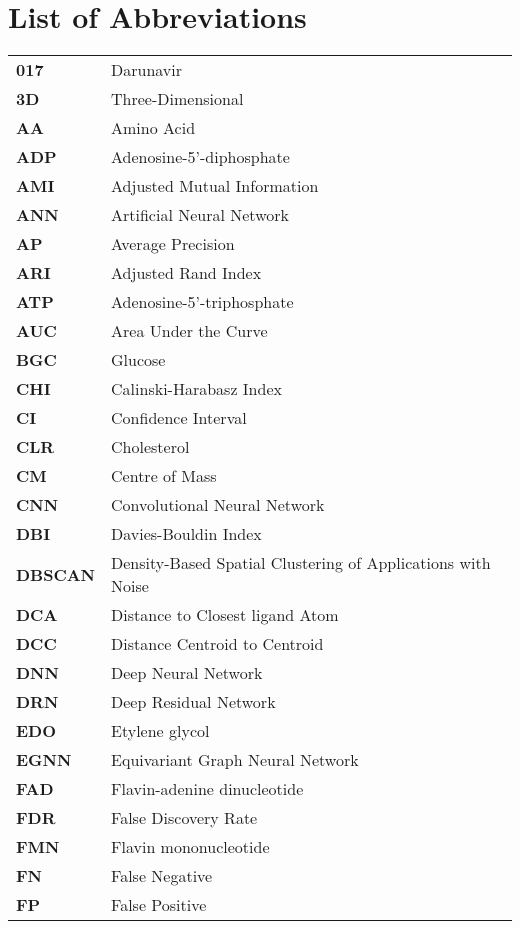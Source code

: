 \chapter*{List of Abbreviations}

\begin{longtable}[l]{@{}p{2.5cm}p{12cm}@{}}
\textbf{017} & Darunavir \\
\textbf{3D} & Three-Dimensional \\
\textbf{AA} & Amino Acid \\
\textbf{ADP} & Adenosine-5'-diphosphate \\
\textbf{AMI} & Adjusted Mutual Information \\
\textbf{ANN} & Artificial Neural Network \\
\textbf{AP} & Average Precision \\
\textbf{ARI} & Adjusted Rand Index \\
\textbf{ATP} & Adenosine-5’-triphosphate \\
\textbf{AUC} & Area Under the Curve \\
\textbf{BGC} & Glucose \\
\textbf{CHI} & Calinski-Harabasz Index \\
\textbf{CI} & Confidence Interval \\
\textbf{CLR} & Cholesterol \\
\textbf{CM} & Centre of Mass \\
\textbf{CNN} & Convolutional Neural Network \\
\textbf{DBI} & Davies-Bouldin Index \\
\textbf{DBSCAN} & Density-Based Spatial Clustering of Applications with Noise \\
\textbf{DCA} & Distance to Closest ligand Atom \\
\textbf{DCC} & Distance Centroid to Centroid \\
\textbf{DNN} & Deep Neural Network \\
\textbf{DRN} & Deep Residual Network \\
\textbf{EDO} & Etylene glycol \\
\textbf{EGNN} & Equivariant Graph Neural Network \\
\textbf{FAD} & Flavin-adenine dinucleotide \\
\textbf{FDR} & False Discovery Rate \\
\textbf{FMN} & Flavin mononucleotide \\
\textbf{FN} & False Negative \\
\textbf{FP} & False Positive \\

\end{longtable}
